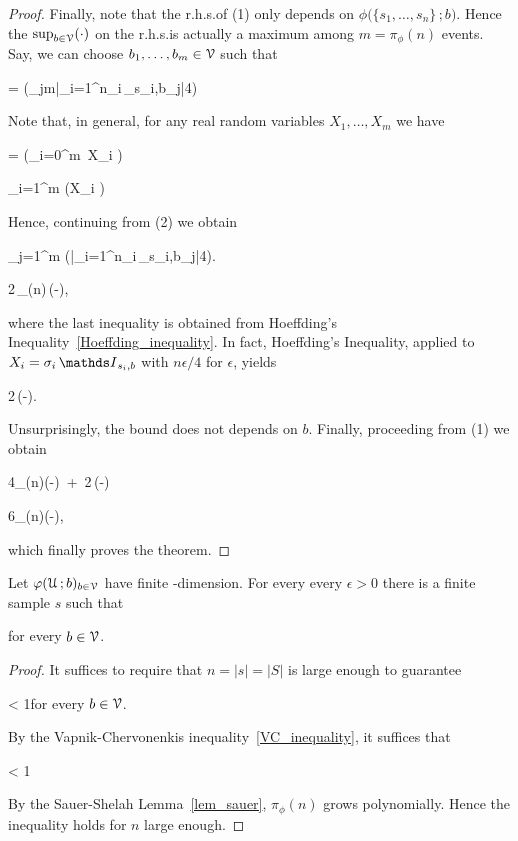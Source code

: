 \documentclass[scombinatorics.tex]{subfiles}
\begin{document}
\begin{proof}
  Finally, note that the r.h.s.\@ of (1) only depends on $\phi\big(\{s_1,\dots,s_n\}\,;b\big)$.
  Hence the $\sup_{b\in\EuScript V}(\cdot)$ on the r.h.s.\@ is actually a maximum among $m=\pi_\phi(n)$ events.
  Say, we can choose $b_1,\dots,b_m\in\EuScript V$ such that

  {=}
  {\Pr\bigg(\max_{j\le m}\Big|\sum_{i=1}^n\sigma_i\,\Indicator_{s_i,b_j}\Big|\ge{}4\bigg)}

  Note that, in general, for any real random variables $X_1,\dots,X_m$ we have

  {=}
  {\Pr\Big(\bigcup_{i=0}^m\ X_i \ge \epsilon\Big)}

  \ceq{}
  {\le}
  {\sum_{i=1}^m \Pr\big(X_i \ge\epsilon\big)}

  Hence, continuing from (2) we obtain

  \ceq{}
  {\le}
  {\sum_{j=1}^m \Pr\bigg(\Big|\sum_{i=1}^n\sigma_i\,\Indicator_{s_i,b_j}\Big|\ge{}4\bigg).}

  \ceq{}
  {\le}
  {2\,\pi_\phi(n)\,\exp\bigg(-\bigg),}

  where the last inequality is obtained from Hoeffding's Inequality~\ref{Hoeffding_inequality}.
  In fact, Hoeffding's Inequality, applied to $X_i=\sigma_i\,\Indicator_{s_i,b}$ with $n\epsilon/4$ for $\epsilon$, yields

  {\le}
  {2\,\exp\Big(-\Big).}

  Unsurprisingly, the bound does not depends on $b$.
  Finally, proceeding from (1) we obtain

  \ceq{}
  {\le}
  {4\pi_\phi(n)\exp\Big(-\Big)\ +\ 2\,\exp\Big(-\Big)}

  \ceq{}
  {\le}
  {6\pi_\phi(n)\exp\Big(-\Big),}

  which finally proves the theorem.
\end{proof}

\begin{corollary}
  Let $\varphi(\EuScript U\,;b)_{b\in\EuScript V}$ have finite \vc-dimension. 
  For every every $\epsilon>0$ there is a finite sample $s$ such that

  \hfill for every $b\in\EuScript V$.
\end{corollary}
\begin{proof}
  It suffices to require that $n=|s|=|S|$ is large enough to guarantee 
  
  {<}
  {1}\hfill for every $b\in\EuScript V$.

  By the Vapnik-Chervonenkis inequality~\ref{VC_inequality}, it suffices that

  {<}
  {1}

  By the Sauer-Shelah Lemma~\ref{lem_sauer}, $\pi_\phi(n)$ grows polynomially.
  Hence the inequality holds for $n$ large enough.
\end{proof}
\end{document}
